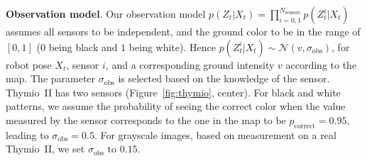 \documentclass{svmult}
\newcommand{\fig}[1]{Figure~\ref{fig:#1}}
\begin{document}
\textbf{Observation model}.
Our observation model $p(Z_t | X_t) = \prod_{i=0,1}^{N_\mathrm{sensors}} p(Z_t^{i} | X_t)$ assumes all sensors to be independent, and the ground color to be in the range of $[0,1]$ ($0$ being black and $1$ being white).
Hence $p(Z_t^{i} | X_t) \sim \mathcal{N}(v,\sigma_\mathrm{obs})$, for robot pose $X_t$, sensor $i$, and a corresponding ground intensity $v$ according to the map.
The parameter $\sigma_\mathrm{obs}$ is selected based on the knowledge of the sensor.
Thymio~II has two sensors (\fig{thymio}, center).
For black and white patterns, we assume the probability of seeing the correct color when the value measured by the sensor corresponds to the one in the map to be $p_\mathrm{correct} = 0.95$, leading to $\sigma_\mathrm{obs} = 0.5$.
For grayscale images, based on measurement on a real Thymio~II, we set $\sigma_\mathrm{obs}$ to $0.15$.

\end{document}

